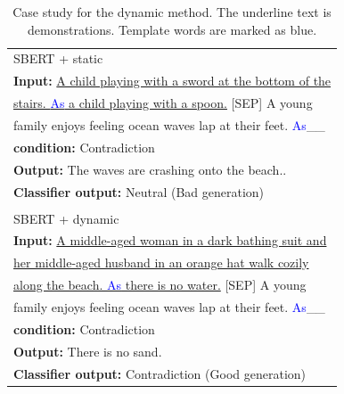 \begin{table}[!h]
	\centering
	\small
	\begin{tabular}{l}
		\toprule
		SBERT + static \\
	   \textbf{Input:} \underline{A child playing with a sword at the bottom of the} \\
	   \underline{stairs. \textcolor{blue}{As} a child playing with a spoon.} [SEP] A young \\
	   family enjoys feeling ocean waves lap at their feet. \textcolor{blue}{As}\_\_\\ 
	   \textbf{condition:} Contradiction \\
	   \textbf{Output:}  The waves are crashing onto the beach..\\
	   \textbf{Classifier output:} Neutral (Bad generation)\\
		\\
		SBERT + dynamic \\
		\textbf{Input:} \underline{A middle-aged woman in a dark bathing suit and} \\\underline{her middle-aged husband in an orange hat walk cozily} \\ \underline{along the beach. \textcolor{blue}{As} there is no water.} [SEP] A young \\ family enjoys feeling ocean waves lap at their feet. \textcolor{blue}{As}\_\_\\ 
		\textbf{condition:} Contradiction \\
		\textbf{Output:}  There is no sand.\\
		\textbf{Classifier output:} Contradiction (Good generation)\\
		\bottomrule
	\end{tabular}
	\caption{Case study for the dynamic method. The underline text is demonstrations. Template words are marked as blue.}
	\label{table:case}
\end{table}

